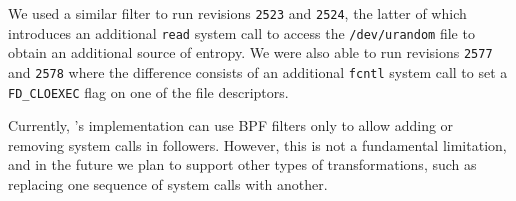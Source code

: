 

We used a similar filter to run revisions \lstinline`2523` and
\lstinline`2524`, the latter of which introduces an additional
\lstinline`read` system call to access the \lstinline`/dev/urandom`
file to obtain an additional source of entropy.  We were also able to
run revisions \lstinline`2577` and \lstinline`2578` where the
difference consists of an additional \lstinline`fcntl` system call to
set a \lstinline`FD_CLOEXEC` flag on one of the file descriptors.

Currently, \varan's implementation can use BPF filters only to allow adding
or removing system calls in followers.  However, this is not a
fundamental limitation, and in the future we plan
to support  other types of transformations, such as replacing one
sequence of system calls with another.





